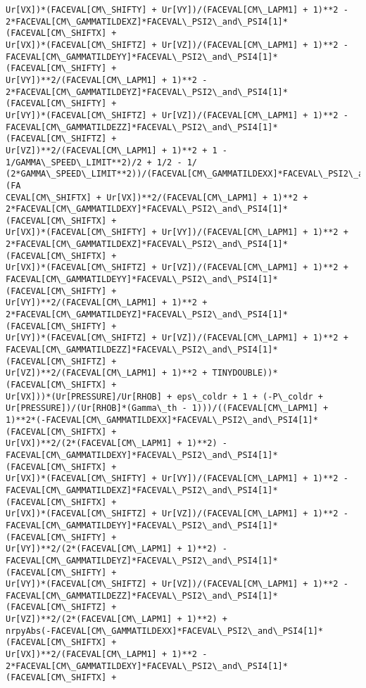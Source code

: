 \documentclass[landscape,letterpaper,10pt,english]{article}
\begin{document}
\begin{Verbatim}[commandchars=\\\{\}]
Ur[VX])*(FACEVAL[CM\_SHIFTY] + Ur[VY])/(FACEVAL[CM\_LAPM1] + 1)**2 -
2*FACEVAL[CM\_GAMMATILDEXZ]*FACEVAL\_PSI2\_and\_PSI4[1]*(FACEVAL[CM\_SHIFTX] +
Ur[VX])*(FACEVAL[CM\_SHIFTZ] + Ur[VZ])/(FACEVAL[CM\_LAPM1] + 1)**2 -
FACEVAL[CM\_GAMMATILDEYY]*FACEVAL\_PSI2\_and\_PSI4[1]*(FACEVAL[CM\_SHIFTY] +
Ur[VY])**2/(FACEVAL[CM\_LAPM1] + 1)**2 -
2*FACEVAL[CM\_GAMMATILDEYZ]*FACEVAL\_PSI2\_and\_PSI4[1]*(FACEVAL[CM\_SHIFTY] +
Ur[VY])*(FACEVAL[CM\_SHIFTZ] + Ur[VZ])/(FACEVAL[CM\_LAPM1] + 1)**2 -
FACEVAL[CM\_GAMMATILDEZZ]*FACEVAL\_PSI2\_and\_PSI4[1]*(FACEVAL[CM\_SHIFTZ] +
Ur[VZ])**2/(FACEVAL[CM\_LAPM1] + 1)**2 + 1 - 1/GAMMA\_SPEED\_LIMIT**2)/2 + 1/2 - 1/
(2*GAMMA\_SPEED\_LIMIT**2))/(FACEVAL[CM\_GAMMATILDEXX]*FACEVAL\_PSI2\_and\_PSI4[1]*(FA
CEVAL[CM\_SHIFTX] + Ur[VX])**2/(FACEVAL[CM\_LAPM1] + 1)**2 +
2*FACEVAL[CM\_GAMMATILDEXY]*FACEVAL\_PSI2\_and\_PSI4[1]*(FACEVAL[CM\_SHIFTX] +
Ur[VX])*(FACEVAL[CM\_SHIFTY] + Ur[VY])/(FACEVAL[CM\_LAPM1] + 1)**2 +
2*FACEVAL[CM\_GAMMATILDEXZ]*FACEVAL\_PSI2\_and\_PSI4[1]*(FACEVAL[CM\_SHIFTX] +
Ur[VX])*(FACEVAL[CM\_SHIFTZ] + Ur[VZ])/(FACEVAL[CM\_LAPM1] + 1)**2 +
FACEVAL[CM\_GAMMATILDEYY]*FACEVAL\_PSI2\_and\_PSI4[1]*(FACEVAL[CM\_SHIFTY] +
Ur[VY])**2/(FACEVAL[CM\_LAPM1] + 1)**2 +
2*FACEVAL[CM\_GAMMATILDEYZ]*FACEVAL\_PSI2\_and\_PSI4[1]*(FACEVAL[CM\_SHIFTY] +
Ur[VY])*(FACEVAL[CM\_SHIFTZ] + Ur[VZ])/(FACEVAL[CM\_LAPM1] + 1)**2 +
FACEVAL[CM\_GAMMATILDEZZ]*FACEVAL\_PSI2\_and\_PSI4[1]*(FACEVAL[CM\_SHIFTZ] +
Ur[VZ])**2/(FACEVAL[CM\_LAPM1] + 1)**2 + TINYDOUBLE))*(FACEVAL[CM\_SHIFTX] +
Ur[VX]))*(Ur[PRESSURE]/Ur[RHOB] + eps\_coldr + 1 + (-P\_coldr +
Ur[PRESSURE])/(Ur[RHOB]*(Gamma\_th - 1)))/((FACEVAL[CM\_LAPM1] +
1)**2*(-FACEVAL[CM\_GAMMATILDEXX]*FACEVAL\_PSI2\_and\_PSI4[1]*(FACEVAL[CM\_SHIFTX] +
Ur[VX])**2/(2*(FACEVAL[CM\_LAPM1] + 1)**2) -
FACEVAL[CM\_GAMMATILDEXY]*FACEVAL\_PSI2\_and\_PSI4[1]*(FACEVAL[CM\_SHIFTX] +
Ur[VX])*(FACEVAL[CM\_SHIFTY] + Ur[VY])/(FACEVAL[CM\_LAPM1] + 1)**2 -
FACEVAL[CM\_GAMMATILDEXZ]*FACEVAL\_PSI2\_and\_PSI4[1]*(FACEVAL[CM\_SHIFTX] +
Ur[VX])*(FACEVAL[CM\_SHIFTZ] + Ur[VZ])/(FACEVAL[CM\_LAPM1] + 1)**2 -
FACEVAL[CM\_GAMMATILDEYY]*FACEVAL\_PSI2\_and\_PSI4[1]*(FACEVAL[CM\_SHIFTY] +
Ur[VY])**2/(2*(FACEVAL[CM\_LAPM1] + 1)**2) -
FACEVAL[CM\_GAMMATILDEYZ]*FACEVAL\_PSI2\_and\_PSI4[1]*(FACEVAL[CM\_SHIFTY] +
Ur[VY])*(FACEVAL[CM\_SHIFTZ] + Ur[VZ])/(FACEVAL[CM\_LAPM1] + 1)**2 -
FACEVAL[CM\_GAMMATILDEZZ]*FACEVAL\_PSI2\_and\_PSI4[1]*(FACEVAL[CM\_SHIFTZ] +
Ur[VZ])**2/(2*(FACEVAL[CM\_LAPM1] + 1)**2) +
nrpyAbs(-FACEVAL[CM\_GAMMATILDEXX]*FACEVAL\_PSI2\_and\_PSI4[1]*(FACEVAL[CM\_SHIFTX] +
Ur[VX])**2/(FACEVAL[CM\_LAPM1] + 1)**2 -
2*FACEVAL[CM\_GAMMATILDEXY]*FACEVAL\_PSI2\_and\_PSI4[1]*(FACEVAL[CM\_SHIFTX] +

\end{Verbatim}
\end{document}
